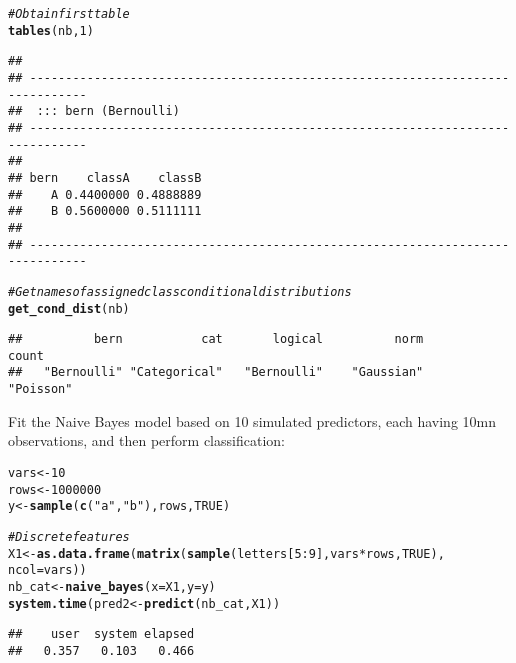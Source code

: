 \documentclass{article}\usepackage[]{graphicx}\usepackage[]{color}
\makeatletter
\newcommand{\hlnum}[1]{\textcolor[rgb]{0.686,0.059,0.569}{#1}}%
\newcommand{\hlstr}[1]{\textcolor[rgb]{0.192,0.494,0.8}{#1}}%
\newcommand{\hlcom}[1]{\textcolor[rgb]{0.678,0.584,0.686}{\textit{#1}}}%
\newcommand{\hlopt}[1]{\textcolor[rgb]{0,0,0}{#1}}%
\newcommand{\hlstd}[1]{\textcolor[rgb]{0.345,0.345,0.345}{#1}}%
\newcommand{\hlkwb}[1]{\textcolor[rgb]{0.69,0.353,0.396}{#1}}%
\newcommand{\hlkwc}[1]{\textcolor[rgb]{0.333,0.667,0.333}{#1}}%
\newcommand{\hlkwd}[1]{\textcolor[rgb]{0.737,0.353,0.396}{\textbf{#1}}}%
\newenvironment{kframe}{%
 \def\at@end@of@kframe{}%
 \ifinner\ifhmode%
  \def\at@end@of@kframe{\end{minipage}}%
  \begin{minipage}{\columnwidth}%
 \fi\fi%
 \def\FrameCommand##1{\hskip\@totalleftmargin \hskip-\fboxsep
 \colorbox{shadecolor}{##1}\hskip-\fboxsep
     \hskip-\linewidth \hskip-\@totalleftmargin \hskip\columnwidth}%
 \MakeFramed {\advance\hsize-\width
   \@totalleftmargin\z@ \linewidth\hsize
   \@setminipage}}%
 {\par\unskip\endMakeFramed%
 \at@end@of@kframe}
\newenvironment{knitrout}{}{} %
\makeatother
\begin{document}
\begin{knitrout}
\begin{kframe}
\begin{alltt}
\hlcom{# Obtain first table}
\hlkwd{tables}\hlstd{(nb,} \hlnum{1}\hlstd{)}
\end{alltt}
\begin{verbatim}
## 
## ------------------------------------------------------------------------------ 
##  ::: bern (Bernoulli) 
## ------------------------------------------------------------------------------ 
##     
## bern    classA    classB
##    A 0.4400000 0.4888889
##    B 0.5600000 0.5111111
## 
## ------------------------------------------------------------------------------
\end{verbatim}
\begin{alltt}
\hlcom{# Get names of assigned class conditional distributions}
\hlkwd{get_cond_dist}\hlstd{(nb)}
\end{alltt}
\begin{verbatim}
##          bern           cat       logical          norm         count 
##   "Bernoulli" "Categorical"   "Bernoulli"    "Gaussian"     "Poisson"
\end{verbatim}
\end{kframe}
\end{knitrout}

Fit the Naive Bayes model based on 10 simulated predictors, each having 10mn observations, and then perform classification:

\begin{knitrout}
\color{fgcolor}\begin{kframe}
\begin{alltt}
\hlstd{vars} \hlkwb{<-} \hlnum{10}
\hlstd{rows} \hlkwb{<-} \hlnum{1000000}
\hlstd{y} \hlkwb{<-} \hlkwd{sample}\hlstd{(}\hlkwd{c}\hlstd{(}\hlstr{"a"}\hlstd{,} \hlstr{"b"}\hlstd{), rows,} \hlnum{TRUE}\hlstd{)}

\hlcom{# Discrete features}
\hlstd{X1} \hlkwb{<-} \hlkwd{as.data.frame}\hlstd{(}\hlkwd{matrix}\hlstd{(}\hlkwd{sample}\hlstd{(letters[}\hlnum{5}\hlopt{:}\hlnum{9}\hlstd{], vars} \hlopt{*} \hlstd{rows,} \hlnum{TRUE}\hlstd{),}
                           \hlkwc{ncol} \hlstd{= vars))}
\hlstd{nb_cat} \hlkwb{<-} \hlkwd{naive_bayes}\hlstd{(}\hlkwc{x} \hlstd{= X1,} \hlkwc{y} \hlstd{= y)}
\hlkwd{system.time}\hlstd{(pred2} \hlkwb{<-} \hlkwd{predict}\hlstd{(nb_cat, X1))}
\end{alltt}
\begin{verbatim}
##    user  system elapsed 
##   0.357   0.103   0.466
\end{verbatim}
\end{kframe}
\end{knitrout}
\end{document}

